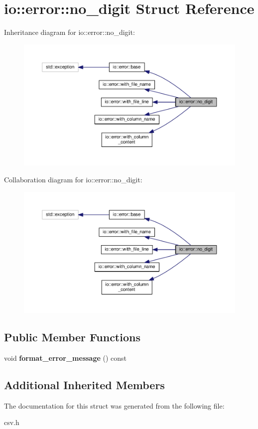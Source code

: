 \section{io\+:\+:error\+:\+:no\+\_\+digit Struct Reference}
\label{structio_1_1error_1_1no__digit}


Inheritance diagram for io\+:\+:error\+:\+:no\+\_\+digit\+:\nopagebreak
\begin{figure}[H]
\begin{center}
\leavevmode
\includegraphics[width=350pt]{structio_1_1error_1_1no__digit__inherit__graph}
\end{center}
\end{figure}


Collaboration diagram for io\+:\+:error\+:\+:no\+\_\+digit\+:\nopagebreak
\begin{figure}[H]
\begin{center}
\leavevmode
\includegraphics[width=350pt]{structio_1_1error_1_1no__digit__coll__graph}
\end{center}
\end{figure}
\subsection*{Public Member Functions}
\begin{DoxyCompactItemize}
\item 
void {\bfseries format\+\_\+error\+\_\+message} () const \label{structio_1_1error_1_1no__digit_a0e2c7f649820beb68b92dab16049388d}

\end{DoxyCompactItemize}
\subsection*{Additional Inherited Members}


The documentation for this struct was generated from the following file\+:\begin{DoxyCompactItemize}
\item 
csv.\+h\end{DoxyCompactItemize}
